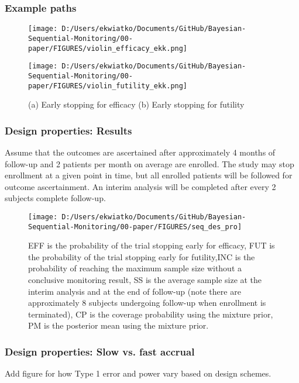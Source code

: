 \documentclass[12pt]{article}
\begin{document}
\subsubsection{Example paths}
\begin{figure}
\texttt{[image: D:/Users/ekwiatko/Documents/GitHub/Bayesian-Sequential-Monitoring/00-paper/FIGURES/violin\_efficacy\_ekk.png]}


\texttt{[image: D:/Users/ekwiatko/Documents/GitHub/Bayesian-Sequential-Monitoring/00-paper/FIGURES/violin\_futility\_ekk.png]}
\caption{(a) Early stopping for efficacy (b) Early stopping for futility}
\end{figure}
\newpage
\subsubsection{Design properties: Results}
Assume that the outcomes are ascertained after approximately 4 months of follow-up and 2 patients per month on average are enrolled. The study may stop enrollment at a given point in time, but all enrolled patients will be followed for outcome ascertainment. An interim analysis will be completed after every 2 subjects complete follow-up.
\begin{figure}
\texttt{[image: D:/Users/ekwiatko/Documents/GitHub/Bayesian-Sequential-Monitoring/00-paper/FIGURES/seq\_des\_pro]}
\caption{EFF is the probability of the trial stopping early for efficacy, FUT is the probability of the trial stopping early for futility,INC is the probability of reaching the maximum sample size without a conclusive monitoring result, SS is the average sample size at the interim analysis and at the end of follow-up (note there are approximately 8 subjects undergoing follow-up when enrollment is terminated), CP is the coverage probability using the mixture prior, PM is the posterior mean using the mixture prior.}
\end{figure}
\newpage
\subsubsection{Design properties: Slow vs. fast accrual}
Add figure for how Type 1 error and power vary based on design schemes.
\newpage
\end{document}
